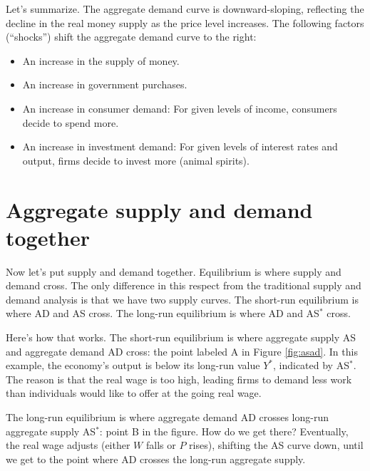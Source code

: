 
Let's summarize.
The aggregate demand
 curve is downward-sloping, reflecting
the decline in the real money supply as the price level increases.
The following factors (``shocks'')
shift the aggregate demand curve to the right:
%
\begin{itemize}
\item An increase in the supply of money.
\item An increase in government purchases.
\item An increase in consumer demand:  For given levels of income,
consumers decide to spend more.
\item An increase in investment demand:
For given levels of interest rates and output,
firms decide to invest more (animal spirits).
\end{itemize}

\section{Aggregate supply and demand together}

Now let's put supply and demand together.
Equilibrium 
 is where supply and demand cross.
The only difference in this respect from
the traditional supply and demand analysis is that we have two
supply curves.
The short-run equilibrium
 is where AD and AS cross.
The long-run equilibrium is where AD and AS$^*$
 cross.

Here's how that works.
The short-run equilibrium is where aggregate supply
 AS and aggregate
demand AD cross:  the point labeled A in Figure \ref{fig:asad}.
In this example, the economy's output is below its long-run
value $Y^*$, indicated by AS$^*$.
The reason is that the real wage is too high, leading firms to demand
less work than individuals would like to offer at the going real wage.

The long-run equilibrium is where aggregate demand
 AD crosses long-run aggregate supply
 AS$^*$:  point B in the figure.
How do we get there?
Eventually, the real wage adjusts (either $W$ falls or $P$ rises),
shifting the AS curve down, until
we get to the point where AD crosses the long-run aggregate supply.

